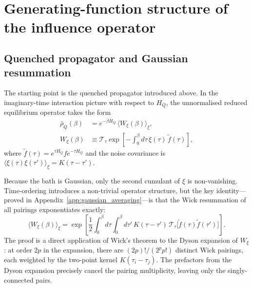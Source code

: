 \section{Generating-function structure of the influence operator\label{sec:generating_function}}

\subsection{Quenched propagator and Gaussian resummation\label{subsec:gaussian_resum}}

The starting point is the quenched propagator introduced above. In the imaginary-time
interaction picture with respect to $H_Q$, the unnormalised reduced equilibrium operator takes the form
\begin{equation}
    \begin{split}
        \bar\rho_Q(\beta)
        & = e^{-\beta H_Q}\,\langle W_\xi(\beta)\rangle_\xi, \\
        W_\xi(\beta)
        & \equiv \mathcal{T}_\tau\exp\!\left[-\int_0^\beta\!d\tau\,\xi(\tau)\,\tilde f(\tau)\right],
    \end{split}
    \label{eq:Wxi_rhobar_def}
\end{equation}
where $\tilde f(\tau)=e^{\tau H_Q}fe^{-\tau H_Q}$ and the noise covariance is
$\langle\xi(\tau)\xi(\tau')\rangle_\xi = K(\tau-\tau')$.

Because the bath is Gaussian, only the second cumulant of $\xi$ is non-vanishing. Time-ordering
introduces a non-trivial operator structure, but the key identity---proved in
Appendix~\ref{app:gaussian_averaging}---is that the Wick resummation of all pairings exponentiates
exactly:
\begin{equation}
    \langle W_\xi(\beta)\rangle_\xi
    = \exp\!\left[\frac{1}{2}\int_0^\beta\!d\tau\int_0^\beta\!d\tau'\,
      K(\tau-\tau')\,\mathcal{T}_\tau\!\big[\tilde f(\tau)\tilde f(\tau')\big]\right].
    \label{eq:Wbar_cumulant}
\end{equation}
The proof is a direct application of Wick's theorem to the Dyson expansion of $W_\xi$: at
order $2p$ in the expansion, there are $(2p)!/(2^p p!)$ distinct Wick pairings, each weighted
by the two-point kernel $K(\tau_i-\tau_j)$. The prefactors from the Dyson expansion precisely
cancel the pairing multiplicity, leaving only the singly-connected pairs. 

